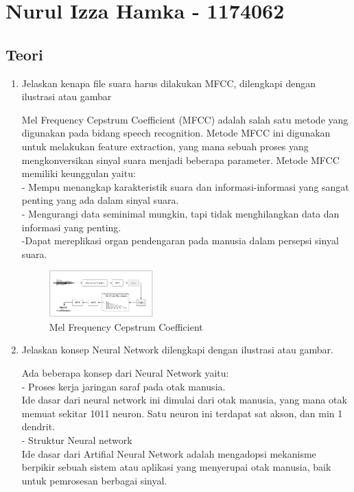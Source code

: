 \section{Nurul Izza Hamka - 1174062}
\subsection{Teori}
\begin{enumerate}

\item Jelaskan kenapa file suara harus dilakukan MFCC, dilengkapi dengan ilustrasi atau gambar

Mel Frequency Cepstrum Coefficient (MFCC) adalah salah satu metode yang digunakan pada bidang speech recognition. Metode MFCC ini digunakan untuk melakukan feature extraction, yang mana sebuah proses yang mengkonversikan sinyal suara menjadi beberapa parameter. Metode MFCC memiliki keunggulan yaitu:\\
- Mempu menangkap karakteristik suara dan informasi-informasi yang sangat penting yang ada dalam sinyal suara.\\
- Mengurangi data seminimal mungkin, tapi tidak menghilangkan data dan informasi yang penting.\\
-Dapat mereplikasi organ pendengaran pada manusia dalam persepsi sinyal suara.

\begin{figure}
	\includegraphics[width=4cm]{figures/1174062/6/no1.png}
	\centering
	\caption{Mel Frequency Cepstrum Coefficient}
\end{figure}

\item Jelaskan konsep Neural Network dilengkapi dengan ilustrasi atau gambar.

Ada beberapa konsep dari Neural Network yaitu:\\
- Proses kerja jaringan saraf pada otak manusia.\\
Ide dasar dari neural network ini dimulai dari otak manusia, yang mana otak memuat sekitar 1011  neuron. Satu neuron ini terdapat sat akson, dan min 1 dendrit.\\
- Struktur Neural network\\
Ide dasar dari Artifial Neural Network adalah mengadopsi mekanisme berpikir sebuah sistem atau aplikasi yang menyerupai otak manusia, baik untuk pemrosesan berbagai sinyal.\\


\end{enumerate}
